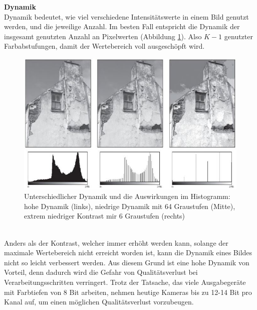 \documentclass[a4paper,12pt,oneside]{article}
\begin{document}
\textbf{Dynamik}\label{s.dynamik}\\
Dynamik bedeutet, wie viel verschiedene Intensitätswerte in einem Bild genutzt werden, und die jeweilige Anzahl\cite[44]{burger2009digitale}. Im besten Fall entspricht die Dynamik der insgesamt genutzten Anzahl an Pixelwerten (Abbildung \ref{img:dynamik}). Also $K-1$ genutzter Farbabstufungen, damit der Wertebereich voll ausgeschöpft wird.\\
 \begin{figure}
    [h]
    \centering
    \includegraphics[scale=0.5]{Sources/dynamik.JPG}
    \caption{Unterschiedlicher Dynamik und die Auswirkungen im Histogramm: hohe Dynamik (links), niedrige Dynamik mit 64 Graustufen (Mitte), extrem niedriger Kontrast mir 6 Graustufen (rechts)\cite[45]{burger2009digitale}}
    \label{img:dynamik}
  \end{figure}\\
Anders als der Kontrast, welcher immer erhöht werden kann, solange der maximale Wertebereich nicht erreicht worden ist, kann die Dynamik eines Bildes nicht so leicht verbessert werden. Aus diesem Grund ist eine hohe Dynamik von Vorteil, denn dadurch wird die Gefahr von Qualitätsverlust bei Verarbeitungsschritten verringert. Trotz der Tatsache, das viele Ausgabegeräte mit Farbtiefen von 8 Bit arbeiten, nehmen heutige Kameras bis zu 12-14 Bit pro Kanal auf, um einen möglichen Qualitätsverlust vorzubeugen.
\newpage
\end{document}

